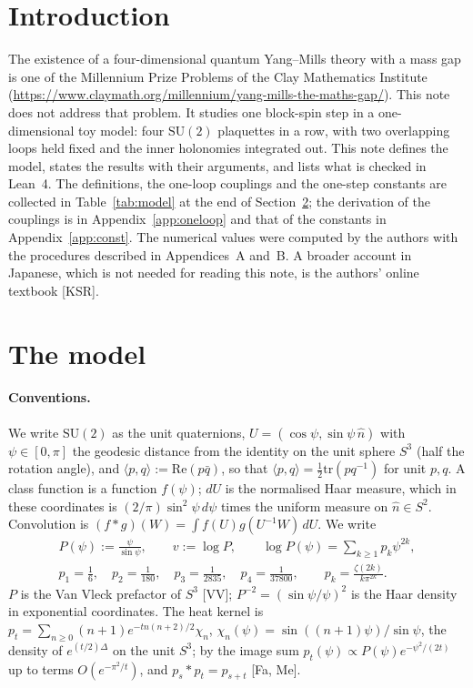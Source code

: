 \documentclass[11pt,a4paper]{article}
\theoremstyle{definition}
\theoremstyle{remark}
\newcommand{\SU}{\mathrm{SU}(2)}
\begin{document}
\section{Introduction}\label{sec:intro}

The existence of a four-dimensional quantum Yang--Mills theory with a mass gap is one of the Millennium Prize Problems of the Clay Mathematics Institute (\url{https://www.claymath.org/millennium/yang-mills-the-maths-gap/}).
This note does not address that problem.
It studies one block-spin step in a one-dimensional toy model: four $\SU$ plaquettes in a row, with two overlapping loops held fixed and the inner holonomies integrated out.
This note defines the model, states the results with their arguments, and lists what is checked in Lean~4.
The definitions, the one-loop couplings and the one-step constants are collected in Table~\ref{tab:model} at the end of Section~\ref{sec:model}; the derivation of the couplings is in Appendix~\ref{app:oneloop} and that of the constants in Appendix~\ref{app:const}.
The numerical values were computed by the authors with the procedures described in Appendices~A and~B.
A broader account in Japanese, which is not needed for reading this note, is the authors' online textbook [KSR].

\section{The model}\label{sec:model}

\paragraph{Conventions.}
We write $\SU$ as the unit quaternions, $U=(\cos\psi,\sin\psi\,\hat n)$ with $\psi\in[0,\pi]$ the geodesic distance from the identity on the unit sphere $S^3$ (half the rotation angle), and $\langle p,q\rangle:=\mathrm{Re}(p\bar q)$, so that $\langle p,q\rangle=\tfrac12\mathrm{tr}(pq^{-1})$ for unit $p,q$.
A class function is a function $f(\psi)$; $dU$ is the normalised Haar measure, which in these coordinates is $(2/\pi)\sin^2\psi\,d\psi$ times the uniform measure on $\hat n\in S^2$.
Convolution is $(f*g)(W)=\int f(U)g(U^{-1}W)\,dU$.
We write
\begin{gather*}
P(\psi):=\frac{\psi}{\sin\psi},\qquad v:=\log P,\qquad \log P(\psi)=\sum_{k\ge1}p_k\psi^{2k},\\
p_1=\tfrac16,\quad p_2=\tfrac1{180},\quad p_3=\tfrac1{2835},\quad p_4=\tfrac1{37800},\qquad p_k=\frac{\zeta(2k)}{k\pi^{2k}}.
\end{gather*}
$P$ is the Van Vleck prefactor of $S^3$ [VV]; $P^{-2}=(\sin\psi/\psi)^2$ is the Haar density in exponential coordinates.
The heat kernel is $p_t=\sum_{n\ge0}(n+1)e^{-tn(n+2)/2}\chi_n$, $\chi_n(\psi)=\sin((n+1)\psi)/\sin\psi$, the density of $e^{(t/2)\Delta}$ on the unit $S^3$; by the image sum $p_t(\psi)\propto P(\psi)e^{-\psi^2/(2t)}$ up to terms $O(e^{-\pi^2/t})$, and $p_s*p_t=p_{s+t}$ [Fa, Me].
\end{document}
